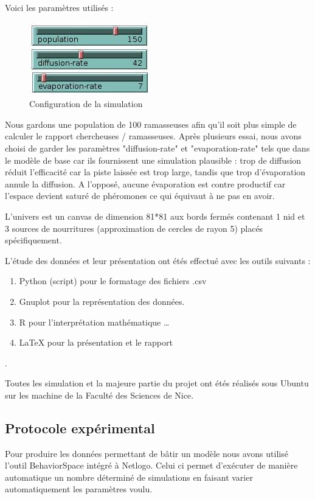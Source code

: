 \documentclass{article}
\begin{document}
Voici les paramètres utilisés :
\begin{figure}[H]
\centering
\includegraphics[scale=0.6]{contenu/settings.jpg} 
\caption{Configuration de la simulation}
\label{fig:Tas}
\end{figure}

Nous gardons une population de 100 ramasseuses afin qu'il soit plus simple de calculer le rapport chercheuses / ramasseuses. Après plusieurs essai, nous avons choisi de garder les paramètres "diffusion-rate" et "evaporation-rate" tels que dans le modèle de base car ils fournissent une simulation plausible : trop de diffusion réduit l'efficacité car la piste laissée est trop large, tandis que trop d'évaporation annule la diffusion. A l'opposé, aucune évaporation est contre productif car l'espace devient saturé de phéromones ce qui équivaut à ne pas en avoir.

L'univers est un canvas de dimension 81*81 aux bords fermés contenant 1 nid et 3 sources de nourritures (approximation de cercles de rayon 5) placés spécifiquement.

L'étude des données et leur présentation ont étés effectué avec les outils suivants :
\begin{enumerate}  
\item Python (script) pour le formatage des fichiers .csv
\item Gnuplot pour la représentation des données.
\item R pour l'interprétation mathématique  \ldots 
\item \LaTeX\xspace pour la présentation et le rapport %
\end{enumerate}.

Toutes les simulation et la majeure partie du projet ont étés réalisés sous Ubuntu sur les machine de la Faculté des Sciences de Nice. 

\subsection{Protocole expérimental}
Pour produire les données permettant de bâtir un modèle nous avons utilisé l'outil BehaviorSpace intégré à Netlogo. Celui ci permet d'exécuter de manière automatique un nombre déterminé de simulations en faisant varier automatiquement les paramètres voulu.
\end{document}
